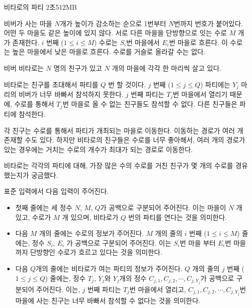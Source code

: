 \begin{problem}{비타로의 파티}
	{}{}
	{2초}{512MB}{}
	
	비버가 사는 마을 $N$개가 높이가 감소하는 순으로 1번부터 $N$번까지 번호가 붙어있다. 어떤 두 마을도 같은 높이에 있지 않다. 서로 다른 마을을 단방향으로 잇는 수로 $M$ 개가 존재한다. $i$ 번째 ($1 \le i \le M$) 수로는 $S_i$번 마을에서 $E_i$번 마을로 흐른다. 이 수로는 높은 마을에서 낮은 마을로 흐른다. 수로를 거슬로 올라갈 수는 없다.
	
	비버 비타로는 $N$ 명의 친구가 있고 $N$ 개의 마을에 각각 한 마리씩 살고 있다.
	
	비타로는 친구를 초대해서 파티를 $Q$ 번 할 것이다. $j$ 번째 ($1 \le j \le Q$) 파티에는 $Y_j$ 마리의 비버가 너무 바빠서 참석하지 못한다. $j$ 번째 파티는 $T_j$번 마을에서 열리기 때문에, 수로를 통해서 $T_j$번 마을로 올 수 없는 친구들도 참석할 수 없다. 다른 친구들은 파티에 참석한다.
	
	각 친구는 수로를 통해서 파티가 개최되는 마을로 이동한다. 이동하는 경로가 여러 개 존재할 수도 있다. 하지만 비타로의 친구들은 수로를 너무 좋아해서, 여러 개의 경로가 있는 경우에는 거치는 수로의 개수가 최대가 되는 경로로 이동한다.
	
	비타로는 각각의 파티에 대해, 가장 많은 수의 수로를 거친 친구가 몇 개의 수로를 경유했는지가 궁금했다.

	\InputFile
	
	표준 입력에서 다음 입력이 주어진다.
	
	\begin{itemize}
		\item 첫째 줄에는 세 정수 $N$, $M$, $Q$가 공백으로 구분되어 주어진다. 이는 마을이 $N$ 개 있고, 수로가 $M$ 개 있으며, 비타로가 $Q$ 번의 파티를 연다는 것을 의미한다.
		\item 다음 $M$ 개의 줄에는 수로의 정보가 주어진다. $M$ 개의 줄의 $i$ 번째 ($1 \le i \le M$) 줄에는, 정수 $S_i$, $E_i$ 가 공백으로 구분되어 주어진다. 이는 $S_i$번 마을 부터 $E_i$번 마을까지 단방향인 수로가 흐르고 있다는 것을 의미한다.
		\item 다음 $Q$개의 줄에는 비타로가 여는 파티의 정보가 주어진다. $Q$ 개의 줄의 $j$ 번째 ($1 \le j \le Q$) 줄에는, 정수 $T_j$, $Y_j$와 $Y_j$개의 정수 $C_{j, 1}, C_{j,2 }, \cdots, C_{j, Y_j}$가 공백으로 구분되어 주어진다. 이는, $j$ 번째 파티는 $T_j$번 마을에서 열리고, $C_{j, 1}, C_{j, 2}, \cdots, C_{j, Y_j}$번 마을에 사는 친구는 너무 바빠서 참석할 수 없다는 것을 의미한다.
	\end{itemize}
		
	\OutputFile
	

\end{problem}
